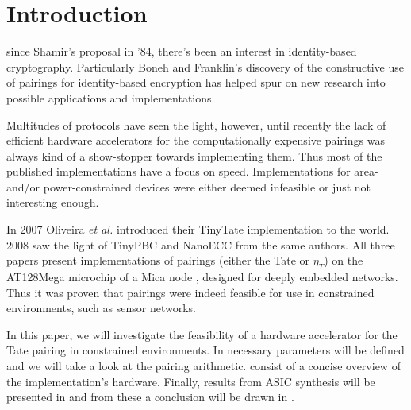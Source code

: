 \section{Introduction\label{section-introduction}}

 since Shamir's proposal \cite{shamir} in '84, there's been an interest in identity-based cryptography. Particularly Boneh and Franklin's \cite{boneh} discovery of the constructive use of pairings for identity-based encryption has helped spur on new research into possible applications and implementations.

Multitudes of protocols have seen the light, however, until recently the lack of efficient hardware accelerators for the computationally expensive pairings was always kind of a show-stopper towards implementing them. Thus most of the published implementations have a focus on speed. Implementations for area- and/or power-constrained devices were either deemed infeasible or just not interesting enough. 

In 2007 Oliveira \emph{et al.} introduced their TinyTate \cite{tinytate} implementation to the world. 2008 saw the light of TinyPBC \cite{tinypbc} and NanoECC \cite{nanoecc} from the same authors. All three papers present implementations of pairings (either the Tate or $\eta_T$) on the AT128Mega microchip of a Mica node \cite{mica}, designed for deeply embedded networks. Thus it was proven that pairings were indeed feasible for use in constrained environments, such as sensor networks.

In this paper, we will investigate the feasibility of a hardware accelerator for the Tate pairing in constrained environments. In  necessary parameters will be defined and we will take a look at the pairing arithmetic.  consist of a concise overview of the implementation's hardware. Finally, results from ASIC synthesis will be presented in  and from these a conclusion will be drawn in .

